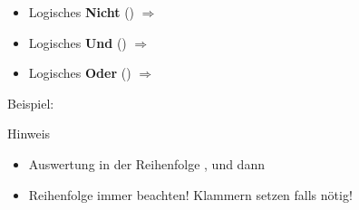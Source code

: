 
\begin{frame}
    \slidehead
    \vspace{-0.1cm}
    \begin{itemize}
        \item Logisches \textbf{Nicht} (\kotlininline{!})  $\Rightarrow$ 
        \item Logisches \textbf{Und} (\kotlininline{&&}) $\Rightarrow$ 
        \item Logisches \textbf{Oder} (\kotlininline{||})  $\Rightarrow$ 
    \end{itemize}
    \vspace{-0.15cm}
    \begin{block}{Beispiel:}
        \vspace{-0.15cm}
        \vspace{-0.15cm}
    \end{block}
    \vspace{-0.15cm}
    \begin{block}{Hinweis}
        \begin{itemize}
            \item Auswertung in der Reihenfolge \kotlininline{!}, \kotlininline{&&} und dann \kotlininline{||}
            \item Reihenfolge immer beachten!
                Klammern setzen falls nötig!
        \end{itemize}
    \end{block}
\end{frame}

